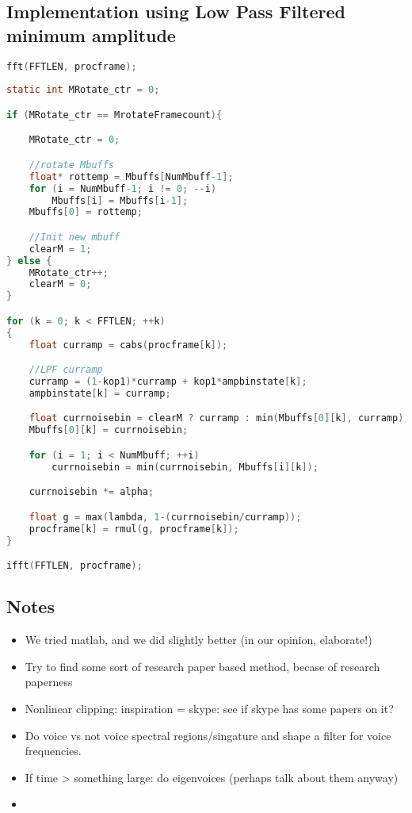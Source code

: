 \documentclass[11pt]{article} %
\begin{document}
 \subsection{Implementation using Low Pass Filtered minimum amplitude} %
 \label{sub:implementation_using_low_pass_filtered_minimum_amplitude}
 \begin{center}
 	\begin{lstlisting}[language = C]
fft(FFTLEN, procframe);
									
static int MRotate_ctr = 0;

if (MRotate_ctr == MrotateFramecount){

	MRotate_ctr = 0;

	//rotate Mbuffs
	float* rottemp = Mbuffs[NumMbuff-1];
	for (i = NumMbuff-1; i != 0; --i)
		Mbuffs[i] = Mbuffs[i-1];
	Mbuffs[0] = rottemp;

	//Init new mbuff
	clearM = 1;
} else {
	MRotate_ctr++;
	clearM = 0;
}

for (k = 0; k < FFTLEN; ++k)
{
	float curramp = cabs(procframe[k]); 

	//LPF curramp
	curramp = (1-kop1)*curramp + kop1*ampbinstate[k];
	ampbinstate[k] = curramp;

	float currnoisebin = clearM ? curramp : min(Mbuffs[0][k], curramp);
	Mbuffs[0][k] = currnoisebin;

	for (i = 1; i < NumMbuff; ++i)
		currnoisebin = min(currnoisebin, Mbuffs[i][k]);

	currnoisebin *= alpha;

	float g = max(lambda, 1-(currnoisebin/curramp));
	procframe[k] = rmul(g, procframe[k]);
}

ifft(FFTLEN, procframe);
 	\end{lstlisting}
 \end{center}

\subsection{Notes} %
\label{sec:notes}
\begin{itemize}
	\item We tried matlab, and we did slightly better (in our opinion, elaborate!)
	\item Try to find some sort of research paper based method, becase of research paperness
	\item Nonlinear clipping: inspiration = skype: see if skype has some papers on it?
	\item Do voice vs not voice spectral regions/singature and shape a filter for voice frequencies.
	\item If time > something large: do eigenvoices (perhaps talk about them anyway)
	\item 

\end{itemize}
\end{document}
